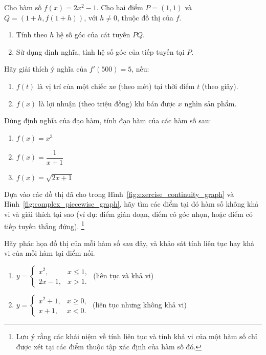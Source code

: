 \begin{exercise}
Cho hàm số $f(x) = 2x^2 - 1$. Cho hai điểm $P=(1, 1)$ và $Q=(1+h, f(1+h))$, với $h \neq 0$, thuộc đồ thị của $f$.
\begin{enumerate}[label=(\alph*)]
    \item Tính theo $h$ hệ số góc của cát tuyến $PQ$.
    \item Sử dụng định nghĩa, tính hệ số góc của tiếp tuyến tại $P$.
\end{enumerate}
\end{exercise}

\begin{exercise}
Hãy giải thích ý nghĩa của $f'(500) = 5$, nếu:
\begin{enumerate}[label=(\alph*)]
    \item $f(t)$ là vị trí của một chiếc xe (theo mét) tại thời điểm $t$ (theo giây).
    \item $f(x)$ là lợi nhuận (theo triệu đồng) khi bán được $x$ nghìn sản phẩm.
\end{enumerate}
\end{exercise}

\begin{exercise}
Dùng định nghĩa của đạo hàm, tính đạo hàm của các hàm số sau:
\begin{enumerate}[label=(\alph*)]
    \item $f(x) = x^3$
    \item $f(x) = \dfrac{1}{x+1}$
    \item $f(x) = \sqrt{2x+1}$
\end{enumerate}
\end{exercise}

\begin{exercise}
Dựa vào các đồ thị đã cho trong Hình~\ref{fig:exercise_continuity_graph} và Hình~\ref{fig:complex_piecewise_graph}, hãy tìm các điểm tại đó hàm số không khả vi và giải thích tại sao (ví dụ: điểm gián đoạn, điểm có góc nhọn, hoặc điểm có tiếp tuyến thẳng đứng). \footnote{Lưu ý rằng các khái niệm về tính liên tục và tính khả vi của một hàm số chỉ được xét tại các điểm thuộc tập xác định của hàm số đó.}
\end{exercise}



\begin{exercise}
Hãy phác họa đồ thị của mỗi hàm số sau đây, và khảo sát tính liên tục hay khả vi của mỗi hàm tại điểm nối.
\begin{enumerate}[label=(\alph*)]
    \item $y = \begin{cases} x^2, & x \le 1, \\ 2x-1, & x > 1. \end{cases}$ \quad (liên tục và khả vi)
    \item $y = \begin{cases} x^2+1, & x \ge 0, \\ x+1, & x < 0. \end{cases}$ \quad (liên tục nhưng không khả vi)
\end{enumerate}
\end{exercise}

